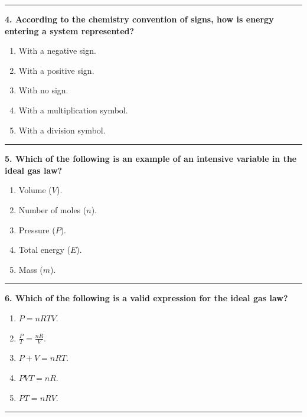 \documentclass[
  9pt,
]{extbook}
\providecommand{\tightlist}{%
  \setlength{\itemsep}{0pt}\setlength{\parskip}{0pt}}
\theoremstyle{definition}
\theoremstyle{definition}
\theoremstyle{definition}
\theoremstyle{remark}
\begin{document}
\begin{center}\rule{0.5\linewidth}{0.5pt}\end{center}

\textbf{4. According to the chemistry convention of signs, how is energy entering a system represented?}

\begin{enumerate}
\def\labelenumi{\alph{enumi}.}
\tightlist
\item
  With a negative sign.
\item
  With a positive sign.
\item
  With no sign.
\item
  With a multiplication symbol.
\item
  With a division symbol.
\end{enumerate}

\begin{center}\rule{0.5\linewidth}{0.5pt}\end{center}

\textbf{5. Which of the following is an example of an intensive variable in the ideal gas law?}

\begin{enumerate}
\def\labelenumi{\alph{enumi}.}
\tightlist
\item
  Volume (\(V\)).
\item
  Number of moles (\(n\)).
\item
  Pressure (\(P\)).
\item
  Total energy (\(E\)).
\item
  Mass (\(m\)).
\end{enumerate}

\begin{center}\rule{0.5\linewidth}{0.5pt}\end{center}

\textbf{6. Which of the following is a valid expression for the ideal gas law?}

\begin{enumerate}
\def\labelenumi{\alph{enumi}.}
\tightlist
\item
  \(P=nRTV\).
\item
  \(\frac{P}{T}=\frac{nR}{V}\).
\item
  \(P+V=nRT\).
\item
  \(PVT=nR\).
\item
  \(PT=nRV\).
\end{enumerate}

\begin{center}\rule{0.5\linewidth}{0.5pt}\end{center}
\end{document}
